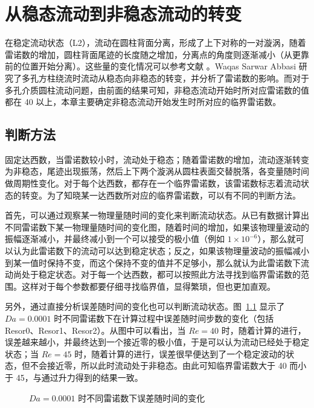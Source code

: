 \chapter{从稳态流动到非稳态流动的转变}\label{chap: transform}

在稳定流动状态（L2），流动在圆柱背面分离，形成了上下对称的一对漩涡，随着雷诺数的增加，圆柱背面尾迹的长度随之增加，分离点的角度则逐渐减小（从更靠前的位置开始分离）。这些量的变化情况可以参考文献 。Waqas Sarwar Abbasi\cite{Abbasi2018} 研究了多孔方柱绕流时流动从稳态向非稳态的转变，并分析了雷诺数的影响。而对于多孔介质圆柱流动问题，由前面的结果可知，非稳态流动开始时所对应雷诺数的值都在 40 以上，本章主要确定非稳态流动开始发生时所对应的临界雷诺数。

\section{判断方法}\label{sec: judgement}

固定达西数，当雷诺数较小时，流动处于稳态；随着雷诺数的增加，流动逐渐转变为非稳态，尾迹出现振荡，然后上下两个漩涡从圆柱表面交替脱落，各变量随时间做周期性变化。对于每个达西数，都存在一个临界雷诺数，该雷诺数标志着流动状态的转变。为了知晓某一达西数所对应的临界雷诺数，可以有不同的判断方法。

首先，可以通过观察某一物理量随时间的变化来判断流动状态。从已有数据计算出不同雷诺数下某一物理量随时间的变化图，随着时间的增加，如果该物理量波动的振幅逐渐减小，并最终减小到一个可以接受的极小值（例如 $1\times 10^{-6}$），那么就可以认为此雷诺数下的流动可以达到稳定状态；反之，如果该物理量波动的振幅减小到某一值时保持不变，而这个保持不变的值并不足够小，那么就认为此雷诺数下流动尚处于稳定状态。对于每一个达西数，都可以按照此方法寻找到临界雷诺数的范围。这样对于每个参数都要仔细寻找临界值，显得繁琐，但也更加直观。

另外，通过直接分析误差随时间的变化也可以判断流动状态。图~\ref{fig: resd} 显示了 $Da=0.0001$ 时不同雷诺数下在计算过程中误差随时间步数的变化（包括 Resor0、Resor1、Resor2）。从图中可以看出，当 $Re=40$ 时，随着计算的进行，误差越来越小，并最终达到一个接近零的极小值，于是可以认为流动已经处于稳定状态；当 $Re=45$ 时，随着计算的进行，误差很早便达到了一个稳定波动的状态，但不会接近零，所以此时流动处于非稳态。由此可知临界雷诺数大于 40 而小于 45，与通过升力得到的结果一致。

\begin{figure}
	\centering
	\begin{minipage}{\textwidth}
		\centering
	\end{minipage}
	\centering
	\begin{minipage}{\textwidth}
		\centering
	\end{minipage}
	\caption{$Da=0.0001$ 时不同雷诺数下误差随时间的变化}
	\label{fig: resd}
\end{figure}

